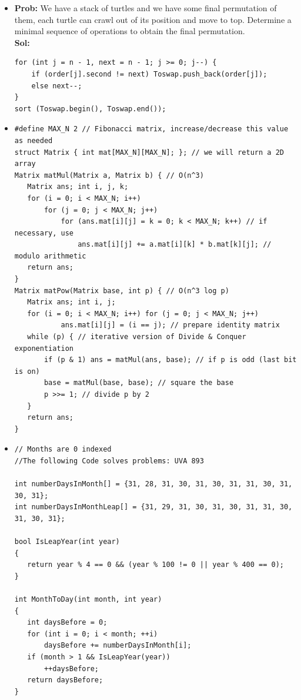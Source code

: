 \documentclass[8pt, a4paper, oneside, twocolumn]{extarticle}
\begin{document}
\begin{itemize}
\begin{verbatim}
    }
    if (rightmost < m) {
       cout << "0\n";
    }
}

    \end{verbatim}
    \item \textbf{Prob: }We have a stack of turtles and we have some final permutation of them, each turtle can crawl out of its position and move to top. Determine a minimal sequence of operations to obtain the final permutation.\\\textbf{Sol: }
    \begin{verbatim}
for (int j = n - 1, next = n - 1; j >= 0; j--) {
    if (order[j].second != next) Toswap.push_back(order[j]);
    else next--;
}
sort (Toswap.begin(), Toswap.end());
\end{verbatim}
    \item \begin{verbatim}
#define MAX_N 2 // Fibonacci matrix, increase/decrease this value as needed
struct Matrix { int mat[MAX_N][MAX_N]; }; // we will return a 2D array
Matrix matMul(Matrix a, Matrix b) { // O(n^3)
   Matrix ans; int i, j, k;
   for (i = 0; i < MAX_N; i++)
       for (j = 0; j < MAX_N; j++)
           for (ans.mat[i][j] = k = 0; k < MAX_N; k++) // if necessary, use
               ans.mat[i][j] += a.mat[i][k] * b.mat[k][j]; // modulo arithmetic
   return ans;
}
Matrix matPow(Matrix base, int p) { // O(n^3 log p)
   Matrix ans; int i, j;
   for (i = 0; i < MAX_N; i++) for (j = 0; j < MAX_N; j++)
           ans.mat[i][j] = (i == j); // prepare identity matrix
   while (p) { // iterative version of Divide & Conquer exponentiation
       if (p & 1) ans = matMul(ans, base); // if p is odd (last bit is on)
       base = matMul(base, base); // square the base
       p >>= 1; // divide p by 2
   }
   return ans;
}
    \end{verbatim}
    \item \begin{verbatim}
// Months are 0 indexed
//The following Code solves problems: UVA 893 

int numberDaysInMonth[] = {31, 28, 31, 30, 31, 30, 31, 31, 30, 31, 30, 31};
int numberDaysInMonthLeap[] = {31, 29, 31, 30, 31, 30, 31, 31, 30, 31, 30, 31};

bool IsLeapYear(int year)
{
   return year % 4 == 0 && (year % 100 != 0 || year % 400 == 0);
}

int MonthToDay(int month, int year)
{
   int daysBefore = 0;
   for (int i = 0; i < month; ++i)
       daysBefore += numberDaysInMonth[i];
   if (month > 1 && IsLeapYear(year))
       ++daysBefore;
   return daysBefore;
}


\end{verbatim}
\end{itemize}
\end{document}
